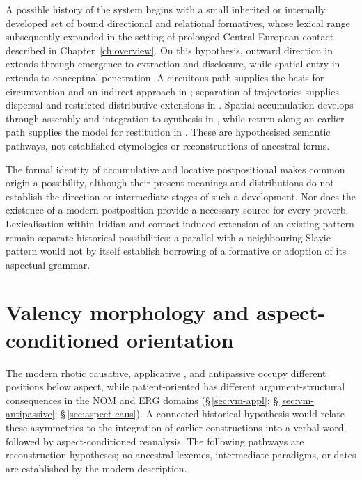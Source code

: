 A possible history of the system begins with a small inherited or internally
developed set of bound directional and relational formatives, whose lexical
range subsequently expanded in the setting of prolonged Central European
contact described in Chapter~\ref{ch:overview}. On this hypothesis, outward
direction in  extends through emergence to extraction and disclosure,
while spatial entry in  extends to conceptual penetration.
A circuitous path supplies the basis for circumvention and an indirect approach
in ; separation of trajectories supplies dispersal and restricted
distributive extensions in . Spatial accumulation develops through
assembly and integration to synthesis in , while return along an
earlier path supplies the model for restitution in . These are
hypothesised semantic pathways, not established etymologies or reconstructions
of ancestral forms.

The formal identity of accumulative  and locative postpositional
 makes common origin a possibility, although their present meanings
and distributions do not establish the direction or intermediate stages of such
a development. Nor does the existence of a modern postposition provide a
necessary source for every preverb. Lexicalisation within Iridian and
contact-induced extension of an existing pattern remain separate historical
possibilities: a parallel with a neighbouring Slavic pattern would not by itself
establish borrowing of a formative or adoption of its aspectual grammar.

\section{Valency morphology and aspect-conditioned orientation}
\label{sec:historical-valency}

The modern rhotic causative, applicative , and antipassive
 occupy different positions below aspect, while patient-oriented
 has different argument-structural consequences in the NOM and ERG
domains (§\,\ref{sec:vm-appl}; §\,\ref{sec:vm-antipassive};
§\,\ref{sec:aspect-caus}). A connected historical hypothesis would relate
these asymmetries to the integration of earlier constructions into a verbal
word, followed by aspect-conditioned reanalysis. The following pathways are
reconstruction hypotheses; no ancestral lexemes, intermediate paradigms, or
dates are established by the modern description.


